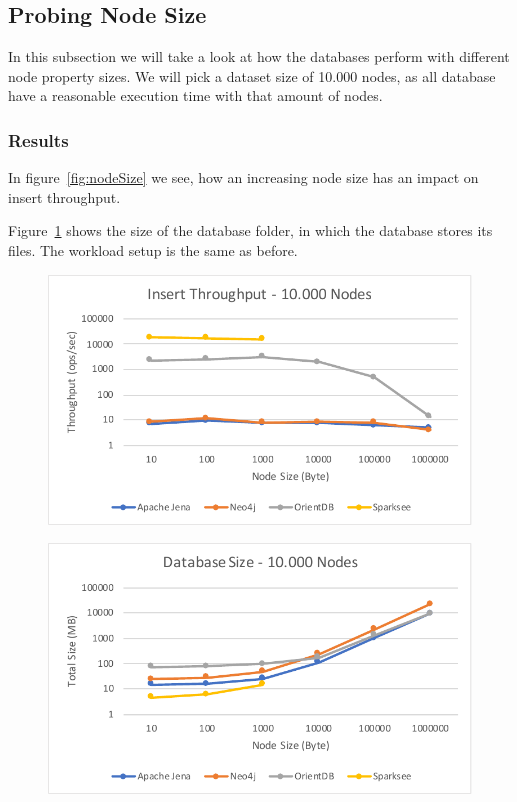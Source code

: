 \subsection{Probing Node Size}
\label{ch:evaluation:se:probingNodeSize}
In this subsection we will take a look at how the databases perform with different node property sizes.
We will pick a dataset size of 10.000 nodes,
as all database have a reasonable execution time with that amount of nodes.

\subsubsection{Results}
In figure~\ref{fig:nodeSize} we see,
how an increasing node size has an impact on insert throughput.

Figure~\ref{fig:sizeDatabaseSize} shows the size of the database folder,
in which the database stores its files.
The workload setup is the same as before.

\begin{figure}[h!]
  \begin{minipage}{.5\textwidth}
    \centering
    \includegraphics[width=\textwidth]{images/throughput/nodeSize}
    \label{fig:nodeSize}
  \end{minipage}
  \begin{minipage}{.5\textwidth}
    \centering
    \includegraphics[width=\textwidth]{images/throughput/sizeDatabaseSize}
    \label{fig:sizeDatabaseSize}
  \end{minipage}
\end{figure}

